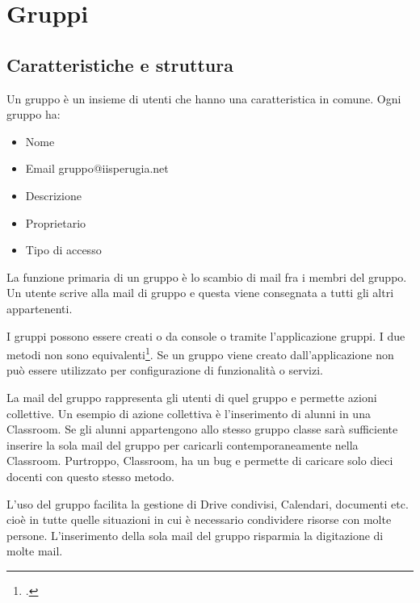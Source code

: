 \chapter{Gruppi}
\section{Caratteristiche e struttura}
Un gruppo è un insieme di utenti che hanno una caratteristica in comune.
Ogni gruppo ha:
\begin{itemize}
	\item Nome	
	\item Email gruppo@iisperugia.net
	\item Descrizione
	\item Proprietario 
	\item Tipo di accesso
\end{itemize}
La funzione primaria di un gruppo è lo scambio di mail fra i membri del gruppo. Un utente scrive alla mail di gruppo e questa viene consegnata a tutti gli altri appartenenti. 

I gruppi possono essere creati o da console o tramite l'applicazione gruppi.
I due metodi non sono equivalenti\footcite{Google2023f}. Se un gruppo viene creato dall'applicazione non può essere utilizzato per configurazione di funzionalità o servizi.
 
La mail del gruppo rappresenta gli utenti di quel gruppo e permette azioni collettive. Un esempio di azione collettiva è l'inserimento di alunni in una Classroom. Se gli alunni appartengono allo stesso gruppo classe sarà sufficiente inserire la sola mail del gruppo per caricarli contemporaneamente nella Classroom. Purtroppo,  Classroom, ha un bug e permette di caricare solo dieci docenti con questo stesso metodo. 

L'uso del gruppo facilita la gestione di Drive condivisi, Calendari, documenti etc. cioè in tutte quelle situazioni in cui è necessario condividere risorse con molte persone. L'inserimento della sola mail del gruppo risparmia la digitazione di molte mail.

